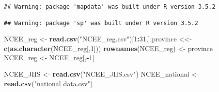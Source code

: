 \documentclass[]{article}
\newenvironment{Shaded}{\begin{snugshade}}{\end{snugshade}}
\newcommand{\KeywordTok}[1]{\textcolor[rgb]{0.13,0.29,0.53}{\textbf{#1}}}
\newcommand{\DecValTok}[1]{\textcolor[rgb]{0.00,0.00,0.81}{#1}}
\newcommand{\StringTok}[1]{\textcolor[rgb]{0.31,0.60,0.02}{#1}}
\newcommand{\OperatorTok}[1]{\textcolor[rgb]{0.81,0.36,0.00}{\textbf{#1}}}
\newcommand{\NormalTok}[1]{#1}
\begin{document}
\begin{verbatim}
## Warning: package 'mapdata' was built under R version 3.5.2
\end{verbatim}

\begin{verbatim}
## Warning: package 'sp' was built under R version 3.5.2
\end{verbatim}

\begin{Shaded}
\begin{Highlighting}[]
\NormalTok{NCEE_reg <-}\StringTok{ }\KeywordTok{read.csv}\NormalTok{(}\StringTok{"NCEE_reg.csv"}\NormalTok{)[}\DecValTok{1}\OperatorTok{:}\DecValTok{31}\NormalTok{,];province <<-}\StringTok{ }\KeywordTok{c}\NormalTok{(}\KeywordTok{as.character}\NormalTok{(NCEE_reg[,}\DecValTok{1}\NormalTok{]))}
\KeywordTok{rownames}\NormalTok{(NCEE_reg) <-}\StringTok{ }\NormalTok{province}
\NormalTok{NCEE_reg <-}\StringTok{ }\NormalTok{NCEE_reg[,}\OperatorTok{-}\DecValTok{1}\NormalTok{]}

\NormalTok{NCEE_JHS <-}\StringTok{ }\KeywordTok{read.csv}\NormalTok{(}\StringTok{"NCEE_JHS.csv"}\NormalTok{)}
\NormalTok{NCEE_national <-}\StringTok{ }\KeywordTok{read.csv}\NormalTok{(}\StringTok{"national data.csv"}\NormalTok{)}
\end{Highlighting}
\end{Shaded}
\end{document}
